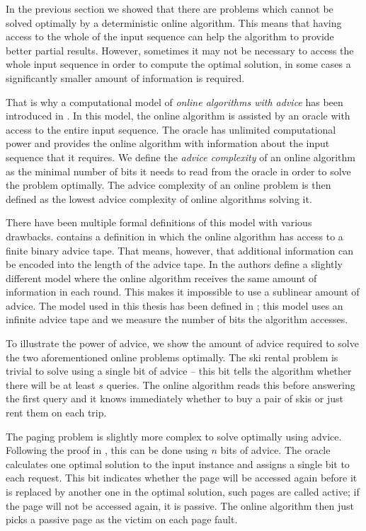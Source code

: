In the previous section we showed that there are problems which cannot be
solved optimally by a deterministic online algorithm. This means that
having access to the whole of the input sequence can help the algorithm to
provide better partial results. However, sometimes it may not be necessary
to access the whole input sequence in order to compute the optimal
solution, in some cases a significantly smaller amount of information is
required.

That is why a computational model of \emph{online algorithms with advice}
has been introduced in \cite{advice-first}. In this model, the online
algorithm is assisted by an oracle with access to the entire input
sequence. The oracle has unlimited computational power and provides the
online algorithm with information about the input sequence that it
requires. We define the \emph{advice complexity} of an online algorithm as
the minimal number of bits it needs to read from the oracle in order to
solve the problem optimally. The advice complexity of an online problem is
then defined as the lowest advice complexity of online algorithms solving
it.

There have been multiple formal definitions of this model with various
drawbacks. \cite{advice-first} contains a definition in which the online
algorithm has access to a finite binary advice tape. That means, however,
that additional information can be encoded into the length of the advice
tape. In \cite{advice-constant} the authors define a slightly different
model where the online algorithm receives the same amount of information
in each round. This makes it impossible to use a sublinear amount of
advice. The model used in this thesis has been defined in
\cite{advice-infinite}; this model uses an infinite advice tape and we
measure the number of bits the algorithm accesses.

To illustrate the power of advice, we show the amount of advice required
to solve the two aforementioned online problems optimally. The ski rental
problem is trivial to solve using a single bit of advice -- this bit tells
the algorithm whether there will be at least $s$ queries. The online
algorithm reads this before answering the first query and it knows
immediately whether to buy a pair of skis or just rent them on each trip.

The paging problem is slightly more complex to solve optimally using
advice. Following the proof in \cite{paging-optimal}, this can be done
using $n$ bits of advice. The oracle calculates one optimal solution to
the input instance and assigns a single bit to each request. This bit
indicates whether the page will be accessed again before it is replaced by
another one in the optimal solution, such pages are called active; if the
page will not be accessed again, it is passive. The online algorithm then
just picks a passive page as the victim on each page fault.

